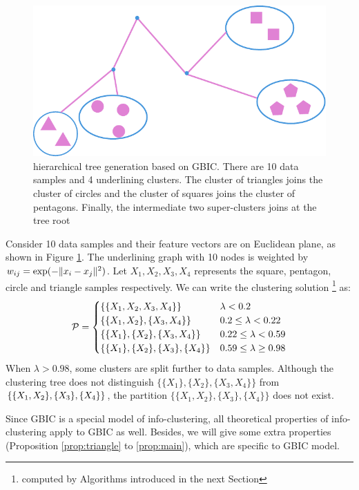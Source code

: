 \begin{example}
\begin{figure}
	\centering
	\includegraphics[width=\textwidth]{GBIC.pdf}
	\caption{hierarchical tree generation based on GBIC. There are 10 data samples and 4 underlining clusters. The cluster of triangles joins the cluster of circles and the cluster of squares joins the cluster of pentagons. Finally, the intermediate two super-clusters joins at the tree root}\label{fig:ta}
\end{figure}
Consider 10 data samples and their feature vectors are on Euclidean plane, as shown in Figure \ref{fig:ta}. The underlining graph with 10 nodes is weighted  by $w_{ij} = \exp(-\norm{x_i - x_j}^2)$. Let $X_1, X_2, X_3, X_4$ represents the square, pentagon, circle and triangle samples respectively. We can write the clustering solution \footnote{computed by Algorithms introduced in the next Section} as:
\begin{equation*}
\P = 
\begin{cases}
\{\{X_1,X_2,X_3,X_4\}\} & \lambda < 0.2 \\
\{\{X_1,X_2\},\{X_3,X_4\}\} & 0.2 \leq \lambda < 0.22 \\
\{\{X_1\},\{X_2\},\{X_3,X_4\}\} & 0.22 \leq \lambda < 0.59\\
\{\{X_1\},\{X_2\},\{X_3\},\{X_4\}\} & 0.59 \leq \lambda \geq 0.98
\end{cases}
\end{equation*}
When $\lambda > 0.98$, some clusters are split further to data samples.
Although the clustering tree does not distinguish
$\{\{X_1\},\{X_2\},\{X_3,X_4\}\}$ from $\{\{X_1,X_2\},\linebreak[2] \{X_3\}, \{X_4\}\}$,
the partition $\{\{X_1,X_2\},\{X_3\}, \{X_4\}\}$ does not exist.
\end{example}

Since GBIC is a special model of info-clustering, all theoretical properties of info-clustering apply to GBIC as well. Besides, we will give some extra properties (Proposition \ref{prop:triangle} to \ref{prop:main}), which are specific to GBIC model.

